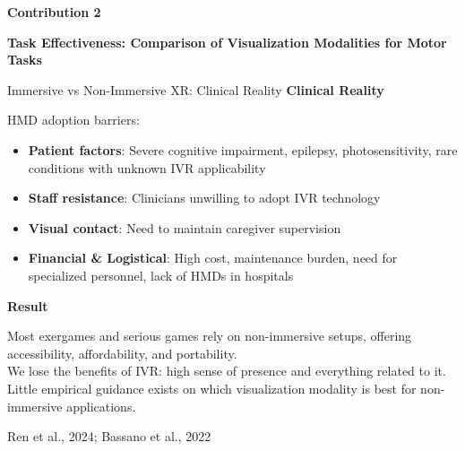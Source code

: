 \documentclass[aspectratio=169, 12pt]{beamer}
\newcommand{\citefooter}[1]{\hfill{\tiny #1}}
\begin{document}

\begin{frame}[plain]
	\vfill
	\begin{center}
		{\large \textcolor{gbAqua}{\textbf{Contribution 2}}}
		
		\vspace{0.4cm}
		
		{\LARGE \textbf{Task Effectiveness: Comparison of Visualization Modalities for Motor Tasks}}
		
	\end{center}
	\vfill
\end{frame}


\begin{frame}{Immersive vs Non-Immersive XR: Clinical Reality}
	\textbf{\textcolor{gbAqua}{Clinical Reality}}
	
	HMD adoption barriers:
	
	\begin{itemize}
		\item \textbf{Patient factors}: Severe cognitive impairment, epilepsy, photosensitivity, rare conditions with unknown IVR applicability
		\item \textbf{Staff resistance}: Clinicians unwilling to adopt IVR technology
		\item \textbf{Visual contact}: Need to maintain caregiver supervision
		\item \textbf{Financial \& Logistical}: High cost, maintenance burden, need for specialized personnel, lack of HMDs in hospitals
	\end{itemize}
	
	\vspace{0.3cm}
	
	\textbf{\textcolor{gbAqua}{Result}}
	
	Most exergames and serious games rely on non-immersive setups, offering accessibility, affordability, and portability.
	\\We lose the benefits of IVR: high sense of presence and everything related to it.
	\\Little empirical guidance exists on which visualization modality is best for non-immersive applications.
	
	\citefooter{Ren et al., 2024; Bassano et al., 2022}
\end{frame}
\end{document}
